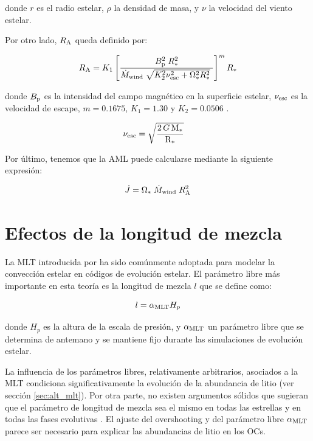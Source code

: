 donde $r$ es el radio estelar, $\rho$ la densidad de masa, y $\nu$ la velocidad del viento estelar.

Por otro lado, $R_{\mathrm{A}}$ queda definido por:

\begin{equation}
	R_{\mathrm{A}} = K_1\left[\frac{B_{\mathrm{p}}^{2}\;R_*^{2}}{\Dot{M}_{\mathrm{wind}}\;\sqrt{K_2^2\nu_{\mathrm{esc}}^2 + \Omega_*^2R_*^{2}}\ }\right]^{m}R_*  \label{eq:mb_ralfven}
\end{equation}

donde $B_{\mathrm{p}}$ es la intensidad del campo magnético en la superficie estelar, $\nu_{\mathrm{esc}}$ es la velocidad de escape, $m = 0.1675$, $K_1 = 1.30$ y $K_2 = 0.0506$ \citep{Gallet2013}.

\begin{align}
	\nu_{\mathrm{esc}} &= \sqrt{\frac{2\,G\,\mathrm{M}_*}{\mathrm{R}_*}} \label{eq:vesc2}
\end{align}

Por último, tenemos que la AML puede calcularse mediante la siguiente expresión:

\begin{equation}
	\Dot{J} = \Omega_* \; \Dot{M}_{\mathrm{wind}} \; R_{\mathrm{A}}^{2} \label{eq:j_dot}
\end{equation}

\section{Efectos de la longitud de mezcla} \label{sec:efectos_mlt}
La MLT introducida por \citet{BohmVit58} ha sido comúnmente adoptada para modelar la convección estelar en códigos de evolución estelar. El parámetro libre más importante en esta teoría es la longitud de mezcla $l$ que se define como:

\begin{equation}
	l = \alpha_{\mathrm{MLT}} H_p\label{eq:mixlength}
\end{equation}

donde $H_p$ es la altura de la escala de presión, y $\alpha_{\mathrm{MLT}}$ un parámetro libre que se determina de antemano y se mantiene fijo durante las simulaciones de evolución estelar. \par

La influencia de los parámetros libres, relativamente arbitrarios, asociados a la MLT condiciona significativamente la evolución de la abundancia de litio (ver sección \ref{sec:alt_mlt}). Por otra parte, no existen argumentos sólidos que sugieran que el parámetro de longitud de mezcla sea el mismo en todas las estrellas y en todas las fases evolutivas \cite{Pasetto2014}. El ajuste del overshooting y del parámetro libre $\alpha_{\mathrm{MLT}}$ parece ser necesario para explicar las abundancias de litio en los OCs.\par

